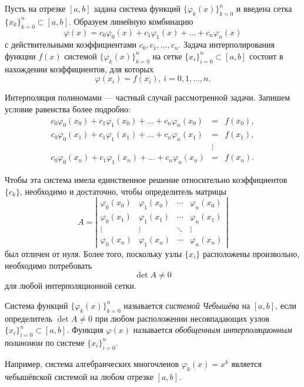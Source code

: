 Пусть на отрезке $[a,b]$ задана система функций
$\{\varphi_{k}(x)\}_{k=0}^{n}$ и введена сетка
$\{x_{k}\}_{k=0}^{n}\subset[a,b]$. Образуем линейную комбинацию
\[
\varphi(x)=c_{0}\varphi_{0}(x)+c_{1}\varphi_{1}(x)+\dots+c_{n}\varphi_{n}(x)
\]
с действительными коэффициентами $c_{0},c_{1},\dots,c_{n}$. Задача
интерполирования функции $f(x)$ системой
$\{\varphi_{k}(x)\}_{k=0}^{n}$ на сетке
$\{x_{i}\}_{i=0}^{n}\subset[a,b]$ состоит в нахождении коэффициентов,
для которых
\[
\varphi(x_{i})=f(x_{i}),\, i=0,1,\dots,n.
\]


Интерполяция полиномами --- частный случай рассмотренной
задачи. Запишем условие равенства более подробно:
\begin{eqnarray*}
c_{0}\varphi_{0}(x_{0})+c_{1}\varphi_{1}(x_{0})+\dots+c_{n}\varphi_{n}(x_{0})
& = &
f(x_{0}),\\ c_{0}\varphi_{0}(x_{1})+c_{1}\varphi_{1}(x_{1})+\dots+c_{n}\varphi_{n}(x_{1})
& = & f(x_{1}),\\ &
\vdots\\ c_{0}\varphi_{0}(x_{n})+c_{1}\varphi_{1}(x_{n})+\dots+c_{n}\varphi_{n}(x_{n})
& = & f(x_{n}).
\end{eqnarray*}

Чтобы эта система имела единственное решение относительно
коэффициентов $\{c_{k}\}$, необходимо и достаточно, чтобы определитель
матрицы
\[
A=\left|\begin{array}{cccc} \varphi_{0}(x_{0}) & \varphi_{1}(x_{0}) &
\cdots & \varphi_{n}(x_{0})\\ \varphi_{0}(x_{1}) & \varphi_{1}(x_{1})
& \cdots & \varphi_{n}(x_{1})\\ \vdots & \vdots & \ddots &
\vdots\\ \varphi_{0}(x_{n}) & \varphi_{1}(x_{n}) & \cdots &
\varphi_{n}(x_{n})
\end{array}\right|
\]
был отличен от нуля. Более того, поскольку узлы $\{x_{i}\}$
расположены произвольно, необходимо потребовать
\[
\det A\neq0
\]
для любой интерполяционной сетки.

Система функций $\{\varphi_{k}(x)\}_{k=0}^{n}$ называется
\emph{системой Чебышёва} на $[a,b]$, если определитель $\det A\neq0$
при любом расположении несовпадающих узлов
$\{x_{i}\}_{i=0}^{n}\subset[a,b]$.  Функция $\varphi(x)$ называется
\emph{обобщенным интерполяционным полиномом} по системе
$\{x_{i}\}_{i=0}^{n}$.

Например, система алгебраических многочленов $\varphi_{k}(x)=x^{k}$
является чебышёвской системой на любом отрезке $[a,b]$.

